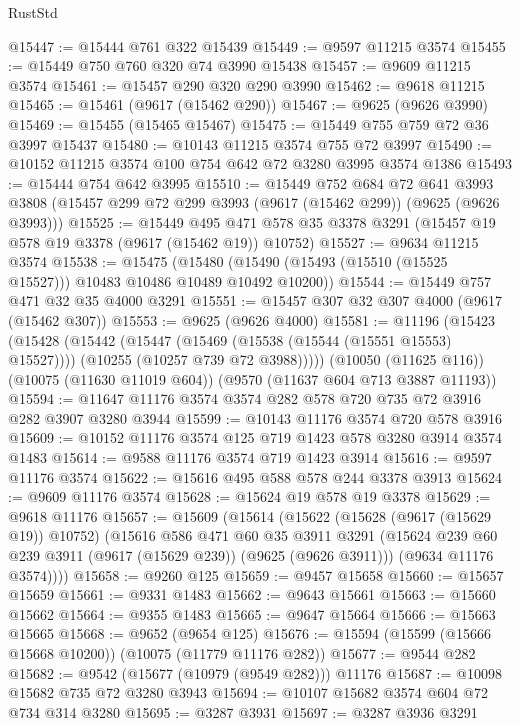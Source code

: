 \begin{lexlean}{RustStd}
\begin{coremodule}
{\begin{coremodule}
{{{{{{{{{{{{{{{{{{{{{{{{{{{{{{{{{@15447 := @15444 @761 @322 @15439
@15449 := @9597 @11215 @3574
@15455 := @15449 @750 @760 @320 @74 @3990 @15438
@15457 := @9609 @11215 @3574
@15461 := @15457 @290 @320 @290 @3990
@15462 := @9618 @11215
@15465 := @15461 (@9617 (@15462 @290))
@15467 := @9625 (@9626 @3990)
@15469 := @15455 (@15465 @15467)
@15475 := @15449 @755 @759 @72 @36 @3997 @15437
@15480 := @10143 @11215 @3574 @755 @72 @3997
@15490 := @10152 @11215 @3574 @100 @754 @642 @72 @3280 @3995 @3574 @1386
@15493 := @15444 @754 @642 @3995
@15510 := @15449
    @752
    @684
    @72
    @641
    @3993
    @3808
    (@15457 @299 @72 @299 @3993 (@9617 (@15462 @299)) (@9625 (@9626 @3993)))
@15525 := @15449
    @495
    @471
    @578
    @35
    @3378
    @3291
    (@15457 @19 @578 @19 @3378 (@9617 (@15462 @19)) @10752)
@15527 := @9634 @11215 @3574
@15538 := @15475
    (@15480 (@15490 (@15493 (@15510 (@15525 @15527))) @10483 @10486 @10489 @10492 @10200))
@15544 := @15449 @757 @471 @32 @35 @4000 @3291
@15551 := @15457 @307 @32 @307 @4000 (@9617 (@15462 @307))
@15553 := @9625 (@9626 @4000)
@15581 := @11196
    (@15423
      (@15428
        (@15442
          (@15447 (@15469 (@15538 (@15544 (@15551 @15553) @15527))))
          (@10255 (@10257 @739 @72 @3988)))))
    (@10050 (@11625 @116))
    (@10075 (@11630 @11019 @604))
    (@9570 (@11637 @604 @713 @3887 @11193))
@15594 := @11647 @11176 @3574 @3574 @282 @578 @720 @735 @72 @3916 @282 @3907 @3280 @3944
@15599 := @10143 @11176 @3574 @720 @578 @3916
@15609 := @10152 @11176 @3574 @125 @719 @1423 @578 @3280 @3914 @3574 @1483
@15614 := @9588 @11176 @3574 @719 @1423 @3914
@15616 := @9597 @11176 @3574
@15622 := @15616 @495 @588 @578 @244 @3378 @3913
@15624 := @9609 @11176 @3574
@15628 := @15624 @19 @578 @19 @3378
@15629 := @9618 @11176
@15657 := @15609
    (@15614
      (@15622
        (@15628 (@9617 (@15629 @19)) @10752)
        (@15616
          @586
          @471
          @60
          @35
          @3911
          @3291
          (@15624 @239 @60 @239 @3911 (@9617 (@15629 @239)) (@9625 (@9626 @3911)))
          (@9634 @11176 @3574))))
@15658 := @9260 @125
@15659 := @9457 @15658
@15660 := @15657 @15659
@15661 := @9331 @1483
@15662 := @9643 @15661
@15663 := @15660 @15662
@15664 := @9355 @1483
@15665 := @9647 @15664
@15666 := @15663 @15665
@15668 := @9652 (@9654 @125)
@15676 := @15594 (@15599 (@15666 @15668 @10200)) (@10075 (@11779 @11176 @282))
@15677 := @9544 @282
@15682 := @9542 (@15677 (@10979 (@9549 @282))) @11176
@15687 := @10098 @15682 @735 @72 @3280 @3943
@15694 := @10107 @15682 @3574 @604 @72 @734 @314 @3280
@15695 := @3287 @3931
@15697 := @3287 @3936 @3291
}}}}}}}}}}}}}}}}}}}}}}}}}}}}}}}}}
\end{coremodule}}
\end{coremodule}
\end{lexlean}
